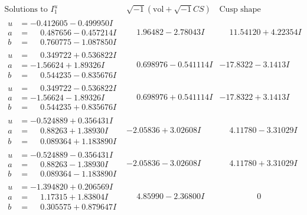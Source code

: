 \documentclass[1p]{elsarticle_modified}
\theoremstyle{definition}
\newcommand{\I}{\sqrt{-1}}
\begin{document}
$$\begin{array}{c|c|c}
\text{Solutions to }I^u_{1}& \I (\text{vol} + \sqrt{-1}CS) & \text{Cusp shape}\\
 \hline 
\begin{aligned}
u &= -0.412605 - 0.499950 I \\
a &= \phantom{-}0.487656 - 0.457214 I \\
b &= \phantom{-}0.760775 - 1.087850 I\end{aligned}
 & \phantom{-}1.96482 - 2.78043 I & \phantom{-}11.54120 + 4.22354 I \\ \hline\begin{aligned}
u &= \phantom{-}0.349722 + 0.536822 I \\
a &= -1.56624 + 1.89326 I \\
b &= \phantom{-}0.544235 - 0.835676 I\end{aligned}
 & \phantom{-}0.698976 - 0.541114 I & -17.8322 - 3.1413 I \\ \hline\begin{aligned}
u &= \phantom{-}0.349722 - 0.536822 I \\
a &= -1.56624 - 1.89326 I \\
b &= \phantom{-}0.544235 + 0.835676 I\end{aligned}
 & \phantom{-}0.698976 + 0.541114 I & -17.8322 + 3.1413 I \\ \hline\begin{aligned}
u &= -0.524889 + 0.356431 I \\
a &= \phantom{-}0.88263 + 1.38930 I \\
b &= \phantom{-}0.089364 + 1.183890 I\end{aligned}
 & -2.05836 + 3.02608 I & \phantom{-}4.11780 - 3.31029 I \\ \hline\begin{aligned}
u &= -0.524889 - 0.356431 I \\
a &= \phantom{-}0.88263 - 1.38930 I \\
b &= \phantom{-}0.089364 - 1.183890 I\end{aligned}
 & -2.05836 - 3.02608 I & \phantom{-}4.11780 + 3.31029 I \\ \hline\begin{aligned}
u &= -1.394820 + 0.206569 I \\
a &= \phantom{-}1.17315 + 1.83804 I \\
b &= \phantom{-}0.305575 + 0.879647 I\end{aligned}
 & \phantom{-}4.85990 - 2.36800 I & \phantom{-0.000000 } 0 \\ \hline\begin{aligned}

\end{aligned}
\end{array}$$
\end{document}

